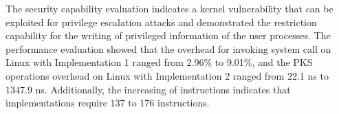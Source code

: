 %
%

%
%
%
The security capability evaluation indicates a kernel vulnerability that can be
exploited for privilege escalation attacks and demonstrated the restriction
capability for the writing of privileged information of the user processes.
%
The performance evaluation showed that the overhead for invoking system call 
on Linux with Implementation 1 ranged from 2.96\% to 9.01\%, and the PKS
operations overhead on Linux with Implementation 2 ranged from 22.1 ns to 1347.9
ns.
%
Additionally, the increasing of instructions indicates that implementations
require 137 to 176 instructions.

